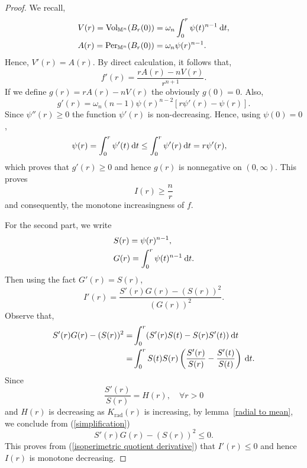 \documentclass[a4paper,11pt,reqno]{amsart}
\renewcommand\eqref[1]{(\ref{#1})}
\theoremstyle{plain}
\numberwithin{equation}{section} \allowdisplaybreaks
\newcommand{\m}{\mathbb{M}^n}
\newcommand{\dt}{\:{\rm d}t}
\newcommand{\uv}{\omega_n}
\begin{document}
\begin{proof}
    We recall,
    \begin{align*}
        &V(r)=\text{Vol}_{\m}(B_r(0))= \uv \int_0^r \psi(t)^{n-1}\dt,\\
        &A(r)= \text{Per}_{\m}(B_r(0))=\uv \psi(r)^{n-1}.
    \end{align*}
    Hence, $V'(r)=A(r)$.
    By direct calculation, it follows that,
    \begin{equation*}
        f'(r)=\frac{rA(r)-nV(r)}{r^{n+1}}.
    \end{equation*}
    If we define $g(r)=rA(r)-nV(r)$ the obviously $g(0)=0$. Also,
    \begin{equation*}
        g'(r)=\uv (n-1)\psi(r)^{n-2}[r\psi'(r)-\psi(r)].
    \end{equation*}
Since $\psi''(r) \geq 0$ the function $\psi'(r)$ is non-decreasing. Hence, using $\psi(0)=0$,
\begin{align*}
    &\psi (r)=\int_0^r \psi'(t)\dt\leq \int_0^r\psi'(r)\dt=r\psi'(r),
\end{align*}
which proves that $g'(r) \geq 0$ and hence $g(r)$ is nonnegative on $(0,\infty)$. This proves 
\begin{equation*}
    I(r) \geq \frac{n}{r}
\end{equation*}
and consequently, the monotone increasingness of $f$.\par 
For the second part, we write 
\begin{align*}
    &S(r)=\psi(r)^{n-1},\\
    &G(r)=\int_{0}^r\psi(t)^{n-1}\dt.
\end{align*}
Then using the fact $G'(r)=S(r)$,
\begin{equation}\label{isoperimetric quotient derivative}
    I'(r)=\frac{S'(r)G(r)-(S(r))^2}{(G(r))^2}.
\end{equation}
Observe that,
\begin{align}\label{simplification}
    S'(r)G(r)-(S(r))^2=& \int_0^r(S'(r)S(t)-S(r)S'(t))\dt\nonumber\\
    =&\int_0^r S(t)S(r)\left(\frac{S'(r)}{S(r)}-\frac{S'(t)}{S(t)}\right)\dt.
\end{align}
Since 
\begin{equation*}
    \frac{S'(r)}{S(r)}=H(r),\quad \forall r>0
\end{equation*}
and $H(r)$ is decreasing as $K_{\text{rad}}(r)$ is increasing, by lemma~\ref{radial to mean}, we conclude from \eqref{simplification} 
\begin{equation*}
    S'(r)G(r)-(S(r))^2\leq 0.
\end{equation*}
This proves from \eqref{isoperimetric quotient derivative} that $I'(r)\leq 0$ and hence $I(r)$ is monotone decreasing.
\end{proof}
\end{document}
